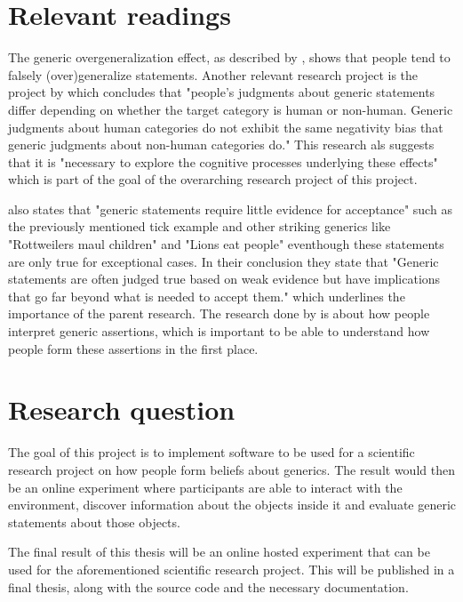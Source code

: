\documentclass{uva-inf-article}
\begin{document}
\section{Relevant readings}
The generic overgeneralization effect, as described by \cite{leslie2011all}, shows that  people tend to falsely (over)generalize statements. Another relevant research project is the project by \cite{tasimi2017differences} which concludes that "people’s
judgments about generic statements differ depending on whether the target category is
human or non-human. Generic judgments about human categories do not exhibit the same
negativity bias that generic judgments about non-human categories do." This research als suggests that it is "necessary to explore the cognitive processes underlying these
effects" which is part of the goal of the overarching research project of this project.

\cite{cimpian2010generic} also states that "generic statements require little evidence for acceptance" such as the previously mentioned tick example and other striking generics like "Rottweilers maul children" and "Lions eat people" eventhough these statements are only true for exceptional cases. In their conclusion they state that "Generic statements are often judged true based on weak evidence but
have implications that go far beyond what is needed to accept them." which underlines the importance of the parent research. 
The research done by \cite{khemlani2007ducks} is about how people interpret generic assertions, which is important to be able to understand how people form these assertions in the first place. 

\section{Research question}
The goal of this project is to implement software to be used for a scientific research project on how people form beliefs about generics. The result would then be an online experiment where participants are able to interact with the environment, discover information about the objects inside it and evaluate generic statements about those objects. 

The final result of this thesis will be an online hosted experiment that can be used for the aforementioned scientific research project. This will be published in a final thesis, along with the source code and the necessary documentation.
\end{document}

